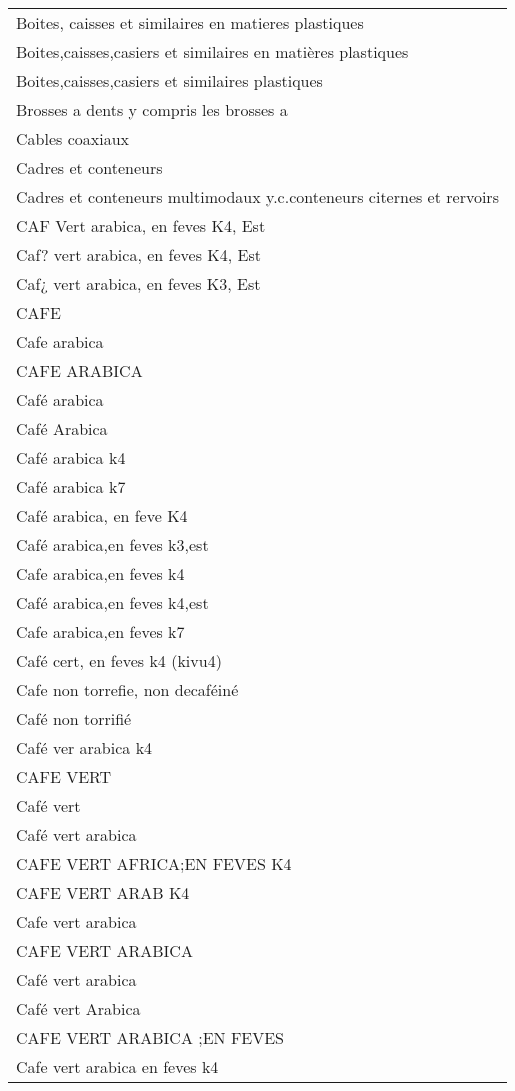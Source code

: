 \documentclass[
]{book}
\begin{document}
\begin{longtable}[t]{l}
\addlinespace
Boites, caisses et similaires en matieres plastiques\\
Boites,caisses,casiers et similaires en matières plastiques\\
Boites,caisses,casiers et similaires plastiques\\
Brosses a dents y compris les brosses a\\
Cables coaxiaux\\
\addlinespace
Cadres et conteneurs\\
Cadres et conteneurs multimodaux y.c.conteneurs citernes et rervoirs\\
CAF Vert arabica, en feves K4, Est\\
Caf? vert arabica, en feves K4, Est\\
Caf¿ vert arabica, en feves K3, Est\\
\addlinespace
CAFE\\
Cafe arabica\\
CAFE ARABICA\\
Café arabica\\
Café Arabica\\
\addlinespace
Café arabica k4\\
Café arabica k7\\
Café arabica, en feve K4\\
Café arabica,en feves k3,est\\
Cafe arabica,en feves k4\\
\addlinespace
Café arabica,en feves k4,est\\
Cafe arabica,en feves k7\\
Café cert, en feves k4 (kivu4)\\
Cafe non torrefie, non decaféiné\\
Café non torrifié\\
\addlinespace
Café ver arabica k4\\
CAFE VERT\\
Café vert\\
Café vert  arabica\\
CAFE VERT AFRICA;EN FEVES K4\\
\addlinespace
CAFE VERT ARAB K4\\
Cafe vert arabica\\
CAFE VERT ARABICA\\
Café vert arabica\\
Café vert Arabica\\
\addlinespace
CAFE VERT ARABICA ;EN FEVES\\
Cafe vert arabica en  feves k4\\

\end{longtable}
\end{document}
